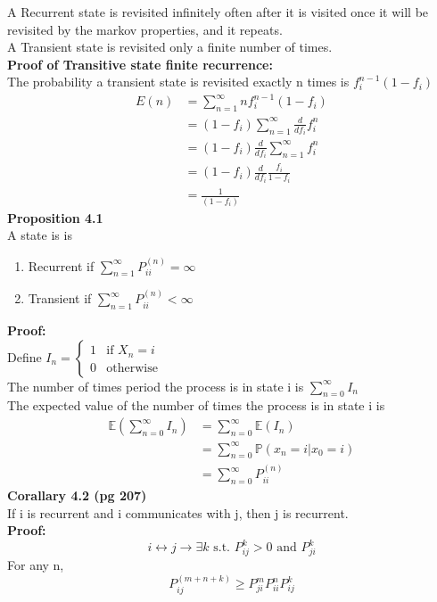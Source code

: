 \documentclass{article}
\newcommand{\prob}{\mathds{P}}
\newcommand{\expec}{\mathds{E}}
\begin{document}
A Recurrent state is revisited infinitely often after it is visited once it will be revisited by the markov properties, and it repeats.\\
A Transient state is revisited only a finite number of times.\\
\textbf{Proof of Transitive state finite recurrence:}\\
The probability a transient state is revisited exactly n times is $f_i^{n-1} (1-f_i)$\\
\begin{align*}
    E(n) &= \sum_{n=1}^{\infty} n f_i^{n-1} (1-f_i)\\
    &= (1-f_i)\sum_{n=1}^{\infty} \frac{d}{df_i} f_i^n\\
    &= (1-f_i)\frac{d}{df_i} \sum_{n=1}^{\infty} f_i^n\\
    &= (1-f_i)\frac{d}{df_i} \frac{f_i}{1-f_i}\\
    &= \frac{1}{(1-f_i)}
\end{align*}
\textbf{Proposition 4.1}\\
A state is is 
\begin{enumerate}
    \item Recurrent if $\sum_{n=1}^{\infty} P_{ii}^{(n)} = \infty$\
    \item Transient if $\sum_{n=1}^{\infty} P_{ii}^{(n)} < \infty$
\end{enumerate}
\textbf{Proof:}\\
Define $I_n = \begin{cases}
    1 & \text{if } X_n = i\\
    0 & \text{otherwise}
\end{cases}
$\\
The number of times period the process is in state i is $\sum_{n=0}^{\infty} I_n$\\
The expected value of the number of times the process is in state i is
\begin{align*}
    \expec(\sum_{n=0}^{\infty} I_n) &= \sum_{n=0}^{\infty} \expec(I_n)\\
    &= \sum_{n=0}^{\infty} \prob(x_n = i |x_0 = i)\\
    &= \sum_{n=0}^{\infty} P_{ii}^{(n)}
\end{align*}
\textbf{Corallary 4.2 (pg 207)}\\
If i is recurrent and i communicates with j, then j is recurrent.\\
\textbf{Proof:}\\
$$i \leftrightarrow j \rightarrow \exists k \text{ s.t. } P_{ij}^k > 0 \text{ and } P_{ji}^k$$ For any n, $$P_{ij}^{(m+n+k)} \geq P_{ji}^m P_{ii}^n P_{ij}^k$$
\end{document}
